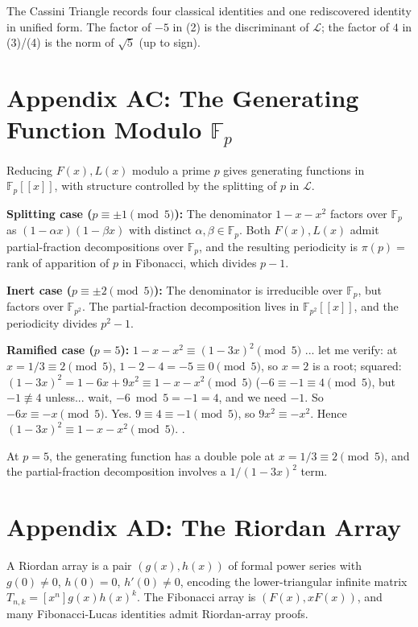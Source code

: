 \begin{remark}
The Cassini Triangle records four classical identities and one
rediscovered identity in unified form. The factor of $-5$ in (2) is
the discriminant of $\mathcal{L}$; the factor of $4$ in (3)/(4) is the
norm of $\sqrt{5}$ (up to sign).
\end{remark}

\section*{Appendix AC: The Generating Function Modulo $\mathbb{F}_p$}
\label{sec:05-app-AC}

Reducing $F(x), L(x)$ modulo a prime $p$ gives generating functions in
$\mathbb{F}_p[[x]]$, with structure controlled by the splitting of $p$
in $\mathcal{L}$.

\textbf{Splitting case ($p \equiv \pm 1 \pmod 5$):} The denominator
$1 - x - x^2$ factors over $\mathbb{F}_p$ as $(1 - \alpha x)(1 - \beta x)$
with distinct $\alpha, \beta \in \mathbb{F}_p$. Both $F(x), L(x)$ admit
partial-fraction decompositions over $\mathbb{F}_p$, and the resulting
periodicity is $\pi(p) = $ rank of apparition of $p$ in Fibonacci, which
divides $p - 1$.

\textbf{Inert case ($p \equiv \pm 2 \pmod 5$):} The denominator is
irreducible over $\mathbb{F}_p$, but factors over $\mathbb{F}_{p^2}$.
The partial-fraction decomposition lives in $\mathbb{F}_{p^2}[[x]]$,
and the periodicity divides $p^2 - 1$.

\textbf{Ramified case ($p = 5$):} $1 - x - x^2 \equiv (1 - 3x)^2 \pmod 5$
... let me verify: at $x = 1/3 \equiv 2 \pmod 5$, $1 - 2 - 4 = -5 \equiv 0 \pmod 5$,
so $x = 2$ is a root; squared: $(1 - 3x)^2 = 1 - 6x + 9x^2 \equiv 1 - x - x^2 \pmod 5$
($-6 \equiv -1 \equiv 4 \pmod 5$, but $-1 \not\equiv 4$ unless... wait, $-6 \bmod 5 = -1 = 4$, and we need $-1$. So $-6x \equiv -x \pmod 5$. Yes. $9 \equiv 4 \equiv -1 \pmod 5$, so $9x^2 \equiv -x^2$. Hence $(1-3x)^2 \equiv 1 - x - x^2 \pmod 5$. \checkmark.

At $p = 5$, the generating function has a double pole at $x = 1/3 \equiv 2 \pmod 5$,
and the partial-fraction decomposition involves a $1/(1-3x)^2$ term.

\section*{Appendix AD: The Riordan Array}
\label{sec:05-app-AD}

A Riordan array is a pair $(g(x), h(x))$ of formal power series with
$g(0) \ne 0$, $h(0) = 0$, $h'(0) \ne 0$, encoding the lower-triangular
infinite matrix $T_{n,k} = [x^n] g(x) h(x)^k$. The Fibonacci array is
$(F(x), x F(x))$, and many Fibonacci-Lucas identities admit Riordan-array
proofs.

